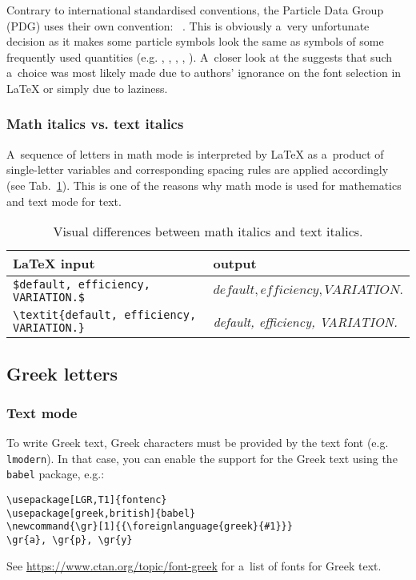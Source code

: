 \documentclass[12pt,a4paper]{article}
\begin{document}
Contrary to international standardised conventions, the Particle Data Group (PDG) uses their own convention: ~\cite[p. 15]{pdg-2018}.
This is obviously a~very unfortunate decision as it makes some particle symbols look the same as symbols of some frequently used quantities (e.g. , , , , ).
A~closer look at the  suggests that such a~choice was most likely made due to authors' ignorance on the font selection in \LaTeX{} or simply due to laziness.

\subsubsection{Math italics vs. text italics}

A~sequence of letters in math mode is interpreted by \LaTeX{} as a~product of single-letter variables and corresponding spacing rules are applied accordingly
(see Tab.~\ref{tab:italics}).
This is one of the reasons why math mode is used for mathematics and text mode for text.

\begin{table}[htbp]
\centering
\caption{Visual differences between math italics and text italics.}
\begin{tabular}{|l|l|}
\hline
\LaTeX{} input & output \\
\hline
\verb_$default, efficiency, VARIATION.$_ & $default, efficiency, VARIATION.$ \\
\verb_\textit{default, efficiency, VARIATION.}_ & \textit{default, efficiency, VARIATION.} \\
\hline
\end{tabular}
\label{tab:italics}
\end{table}

\subsection{Greek letters}
\label{sec:greek}

\subsubsection{Text mode}
\label{subsec:greek-text}

To write Greek text, Greek characters must be provided by the text font (e.g. \texttt{lmodern}).
In that case, you can enable the support for the Greek text using the \texttt{babel} package, e.g.:
\begin{verbatim}
\usepackage[LGR,T1]{fontenc}
\usepackage[greek,british]{babel}
\newcommand{\gr}[1]{{\foreignlanguage{greek}{#1}}}
\gr{a}, \gr{p}, \gr{y}
\end{verbatim}
See \url{https://www.ctan.org/topic/font-greek} for a~list of fonts for Greek text.
\end{document}
